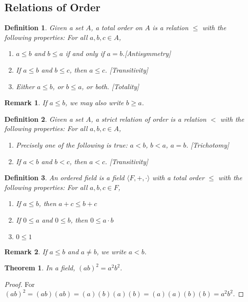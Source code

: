 \documentclass[crop=false,class=book]{standalone}
\theoremstyle{mystyle}
\newtheorem{theorem}{Theorem}[section]
\newtheorem{definition}{Definition}[section]
\newtheorem{remark}{Remark}[section]
\begin{document}
\subsection{Relations of Order}
\begin{definition}
Given a set $A$, a total order on $A$ is a relation $\leq$ with the following properties: For all $a,b,c\in A$,
\begin{enumerate}
    \item $a\leq b$ and $b\leq a$ if and only if $a=b$.\hfill [Antisymmetry]
    \item If $a\leq b$ and $b\leq c$, then $a\leq c$. \hfill [Transitivity]
    \item Either $a\leq b$, or $b\leq a$, or both. \hfill [Totality]
\end{enumerate}
\end{definition}
\begin{remark}
If $a\leq b$, we may also write $b\geq a$.
\end{remark}
\begin{definition}
Given a set $A$, a strict relation of order is a relation $<$ with the following properties: For all $a,b,c\in A$,
\begin{enumerate}
    \item Precisely one of the following is true: $a<b$, $b<a$, $a=b$. \hfill [Trichotomy]
    \item If $a<b$ and $b<c$, then $a<c$. \hfill [Transitivity]
\end{enumerate}
\end{definition}
\begin{definition}
An ordered field is a field $\langle F,+,\cdot \rangle$ with a total order $\leq$ with the following properties: For all $a,b,c\in F$,
\begin{enumerate}
    \item If $a\leq b$, then $a+c\leq b+c$
    \item If $0 \leq a$ and $0\leq b$, then $0\leq a\cdot b$
    \item $0\leq 1$
\end{enumerate}
\end{definition}
\begin{remark}
If $a\leq b$ and $a\ne b$, we write $a<b$.
\end{remark}
\begin{theorem}
In a field, $(ab)^2 = a^2b^2$.
\end{theorem}
\begin{proof}
For $(ab)^2 = (ab)(ab)=(a)(b)(a)(b)= (a)(a)(b)(b)=a^2b^2$.
\end{proof}
\end{document}
